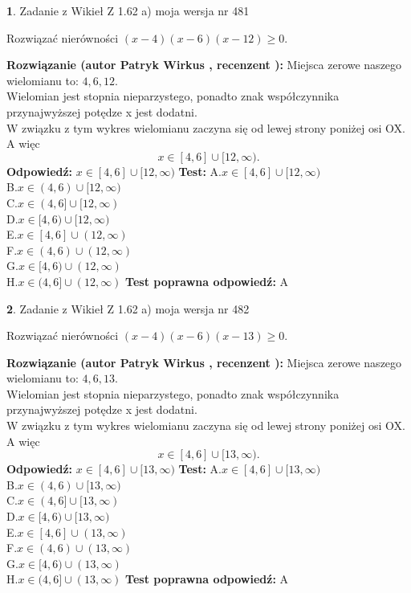\documentclass[12pt, a4paper]{article}
\theoremstyle{definition} %
\newtheorem{zad}{}
\newcommand{\zadStart}[1]{\begin{zad}#1\newline}
\newcommand{\zadStop}{\end{zad}}
\newcommand{\rozwStart}[2]{\noindent \textbf{Rozwiązanie (autor #1 , recenzent #2): }\newline}
\newcommand{\rozwStop}{\newline}
\newcommand{\odpStart}{\noindent \textbf{Odpowiedź:}\newline}
\newcommand{\odpStop}{\newline}
\newcommand{\testStart}{\noindent \textbf{Test:}\newline}
\newcommand{\testStop}{\newline}
\newcommand{\kluczStart}{\noindent \textbf{Test poprawna odpowiedź:}\newline}
\newcommand{\kluczStop}{\newline}
\begin{document}
\zadStart{Zadanie z Wikieł Z 1.62 a) moja wersja nr 481}

Rozwiązać nierówności $(x-4)(x-6)(x-12)\ge0$.
\zadStop
\rozwStart{Patryk Wirkus}{}
Miejsca zerowe naszego wielomianu to: $4, 6, 12$.\\
Wielomian jest stopnia nieparzystego, ponadto znak współczynnika przy\linebreak najwyższej potędze x jest dodatni.\\ W związku z tym wykres wielomianu zaczyna się od lewej strony poniżej osi OX. A więc $$x \in [4,6] \cup [12,\infty).$$
\rozwStop
\odpStart
$x \in [4,6] \cup [12,\infty)$
\odpStop
\testStart
A.$x \in [4,6] \cup [12,\infty)$\\
B.$x \in (4,6) \cup [12,\infty)$\\
C.$x \in (4,6] \cup [12,\infty)$\\
D.$x \in [4,6) \cup [12,\infty)$\\
E.$x \in [4,6] \cup (12,\infty)$\\
F.$x \in (4,6) \cup (12,\infty)$\\
G.$x \in [4,6) \cup (12,\infty)$\\
H.$x \in (4,6] \cup (12,\infty)$
\testStop
\kluczStart
A
\kluczStop



\zadStart{Zadanie z Wikieł Z 1.62 a) moja wersja nr 482}

Rozwiązać nierówności $(x-4)(x-6)(x-13)\ge0$.
\zadStop
\rozwStart{Patryk Wirkus}{}
Miejsca zerowe naszego wielomianu to: $4, 6, 13$.\\
Wielomian jest stopnia nieparzystego, ponadto znak współczynnika przy\linebreak najwyższej potędze x jest dodatni.\\ W związku z tym wykres wielomianu zaczyna się od lewej strony poniżej osi OX. A więc $$x \in [4,6] \cup [13,\infty).$$
\rozwStop
\odpStart
$x \in [4,6] \cup [13,\infty)$
\odpStop
\testStart
A.$x \in [4,6] \cup [13,\infty)$\\
B.$x \in (4,6) \cup [13,\infty)$\\
C.$x \in (4,6] \cup [13,\infty)$\\
D.$x \in [4,6) \cup [13,\infty)$\\
E.$x \in [4,6] \cup (13,\infty)$\\
F.$x \in (4,6) \cup (13,\infty)$\\
G.$x \in [4,6) \cup (13,\infty)$\\
H.$x \in (4,6] \cup (13,\infty)$
\testStop
\kluczStart
A
\kluczStop
\end{document}
